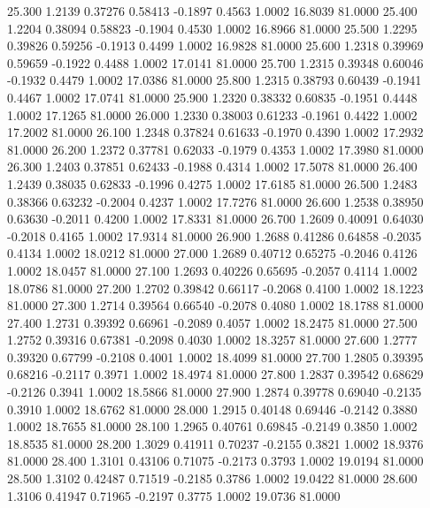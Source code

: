   25.300   1.2139   0.37276   0.58413  -0.1897   0.4563   1.0002  16.8039  81.0000
  25.400   1.2204   0.38094   0.58823  -0.1904   0.4530   1.0002  16.8966  81.0000
  25.500   1.2295   0.39826   0.59256  -0.1913   0.4499   1.0002  16.9828  81.0000
  25.600   1.2318   0.39969   0.59659  -0.1922   0.4488   1.0002  17.0141  81.0000
  25.700   1.2315   0.39348   0.60046  -0.1932   0.4479   1.0002  17.0386  81.0000
  25.800   1.2315   0.38793   0.60439  -0.1941   0.4467   1.0002  17.0741  81.0000
  25.900   1.2320   0.38332   0.60835  -0.1951   0.4448   1.0002  17.1265  81.0000
  26.000   1.2330   0.38003   0.61233  -0.1961   0.4422   1.0002  17.2002  81.0000
  26.100   1.2348   0.37824   0.61633  -0.1970   0.4390   1.0002  17.2932  81.0000
  26.200   1.2372   0.37781   0.62033  -0.1979   0.4353   1.0002  17.3980  81.0000
  26.300   1.2403   0.37851   0.62433  -0.1988   0.4314   1.0002  17.5078  81.0000
  26.400   1.2439   0.38035   0.62833  -0.1996   0.4275   1.0002  17.6185  81.0000
  26.500   1.2483   0.38366   0.63232  -0.2004   0.4237   1.0002  17.7276  81.0000
  26.600   1.2538   0.38950   0.63630  -0.2011   0.4200   1.0002  17.8331  81.0000
  26.700   1.2609   0.40091   0.64030  -0.2018   0.4165   1.0002  17.9314  81.0000
  26.900   1.2688   0.41286   0.64858  -0.2035   0.4134   1.0002  18.0212  81.0000
  27.000   1.2689   0.40712   0.65275  -0.2046   0.4126   1.0002  18.0457  81.0000
  27.100   1.2693   0.40226   0.65695  -0.2057   0.4114   1.0002  18.0786  81.0000
  27.200   1.2702   0.39842   0.66117  -0.2068   0.4100   1.0002  18.1223  81.0000
  27.300   1.2714   0.39564   0.66540  -0.2078   0.4080   1.0002  18.1788  81.0000
  27.400   1.2731   0.39392   0.66961  -0.2089   0.4057   1.0002  18.2475  81.0000
  27.500   1.2752   0.39316   0.67381  -0.2098   0.4030   1.0002  18.3257  81.0000
  27.600   1.2777   0.39320   0.67799  -0.2108   0.4001   1.0002  18.4099  81.0000
  27.700   1.2805   0.39395   0.68216  -0.2117   0.3971   1.0002  18.4974  81.0000
  27.800   1.2837   0.39542   0.68629  -0.2126   0.3941   1.0002  18.5866  81.0000
  27.900   1.2874   0.39778   0.69040  -0.2135   0.3910   1.0002  18.6762  81.0000
  28.000   1.2915   0.40148   0.69446  -0.2142   0.3880   1.0002  18.7655  81.0000
  28.100   1.2965   0.40761   0.69845  -0.2149   0.3850   1.0002  18.8535  81.0000
  28.200   1.3029   0.41911   0.70237  -0.2155   0.3821   1.0002  18.9376  81.0000
  28.400   1.3101   0.43106   0.71075  -0.2173   0.3793   1.0002  19.0194  81.0000
  28.500   1.3102   0.42487   0.71519  -0.2185   0.3786   1.0002  19.0422  81.0000
  28.600   1.3106   0.41947   0.71965  -0.2197   0.3775   1.0002  19.0736  81.0000
